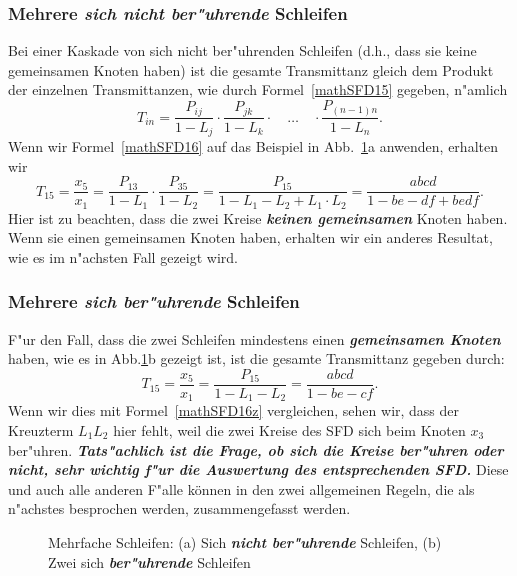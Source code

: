 \subsubsection{Mehrere \textbf{\emph{sich nicht ber"uhrende}} Schleifen}
Bei einer Kaskade von sich nicht ber"uhrenden Schleifen (d.h., dass
sie keine gemeinsamen Knoten haben) ist die gesamte Transmittanz
gleich dem Produkt der einzelnen Transmittanzen, wie durch Formel~\ref{mathSFD15}
gegeben, n"amlich 
\begin{equation}
 T_{in} = \frac{P_{ij}}{1-L_j}\cdot \frac{P_{jk}}{1-L_k}\cdot\quad \ldots\quad\cdot\frac{P_{(n-1)n}}{1-L_n}. \label{mathSFD16} 
\end{equation}
\nit Wenn wir Formel~\ref{mathSFD16} auf das Beispiel in Abb.~\ref{SFD16}a anwenden, erhalten wir 
\begin{equation}
 T_{15} =  \frac{x_5}{x_1} = \frac{P_{13}}{1-L_1}\cdot \frac{P_{35}}{1-L_2}= \frac{P_{15}}{1-L_1-L_2+L_1\cdot L_2} = \frac{abcd}{1-be -df + bedf}.\label{mathSFD16z}
\end{equation}
Hier ist zu beachten, dass die zwei Kreise \textbf{\emph{keinen
    gemeinsamen}} Knoten haben. Wenn sie einen gemeinsamen Knoten
haben, erhalten wir ein anderes Resultat, wie es im n"achsten Fall
gezeigt wird.

\subsubsection{Mehrere \textbf{\emph{sich ber"uhrende}} Schleifen} 
F"ur den Fall, dass die zwei Schleifen mindestens einen \textbf{\emph{gemeinsamen
Knoten}} haben, wie es in Abb.\ref{SFD16}b gezeigt ist, ist die gesamte
Transmittanz gegeben durch: 
\begin{equation*}
 T_{15} =  \frac{x_5}{x_1} = \frac{P_{15}}{1-L_1-L_2} = \frac{abcd}{1-be -cf}.
\end{equation*}
Wenn wir dies mit Formel~\ref{mathSFD16z} vergleichen, sehen wir, dass
der Kreuzterm  $L_1L_2$ hier fehlt, weil die zwei
Kreise des SFD sich beim Knoten $x_3$ ber"uhren. {\it\textbf{Tats"achlich ist die
Frage, ob sich die Kreise ber"uhren oder nicht, sehr wichtig f"ur die
Auswertung des entsprechenden SFD.}} Diese und auch alle
 anderen F"alle k\"onnen in den zwei allgemeinen Regeln,
die als n"achstes besprochen werden, zusammengefasst werden.

\begin{figure}[htb!]
\begin{center}
  \caption{Mehrfache Schleifen: (a)
Sich \textbf{\emph{nicht ber"uhrende}} Schleifen, (b) Zwei sich \textbf{\emph{ber"uhrende}} Schleifen}\label{SFD16}
\end{center}
\vspace*{-7mm}
\end{figure}

